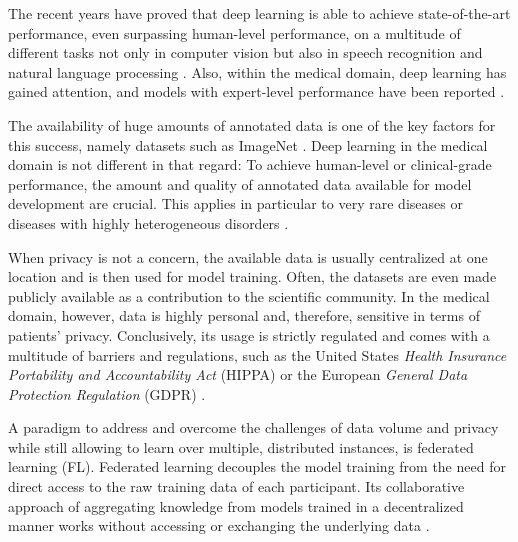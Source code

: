 The recent years have proved that deep learning is able to achieve state-of-the-art performance, even surpassing human-level performance, on a multitude of different tasks not only in computer vision but also in speech recognition and natural language processing \citep{He2015DelvingClassification, Hinton2012DeepGroups, Devlin2019BERT:Understanding}. Also, within the medical domain, deep learning has gained attention, and models with expert-level performance have been reported \citep{Esteva2017Dermatologist-levelNetworks}.

The availability of huge amounts of annotated data is one of the key factors for this success, namely datasets such as ImageNet \citep{Deng2010}. Deep learning in the medical domain is not different in that regard: To achieve human-level or clinical-grade performance, the amount and quality of annotated data available for model development are crucial. This applies in particular to very rare diseases or diseases with highly heterogeneous disorders \citep{Esteva2017Dermatologist-levelNetworks, DeFauw2018ClinicallyDisease, Dluhos2017Multi-centerApproach}.



When privacy is not a concern, the available data is usually centralized at one location and is then used for model training. Often, the datasets are even made publicly available as a contribution to the scientific community. In the medical domain, however, data is highly personal and, therefore, sensitive in terms of patients' privacy. Conclusively, its usage is strictly regulated and comes with a multitude of barriers and regulations, such as the United States \textit{Health Insurance Portability and Accountability Act} (HIPPA) \citep{USDepartmentofHealthandHumanServices2020HealthHIPPA} or the European \textit{General Data Protection Regulation} (GDPR) \citep{EuropeanCommission2018GeneralGDPR} \citep{vanPanhuis2014AHealth}.

A paradigm to address and overcome the challenges of data volume and privacy while still allowing to learn over multiple, distributed instances, is federated learning (FL). Federated learning decouples the model training from the need for direct access to the raw training data of each participant. Its collaborative approach of aggregating knowledge from models trained in a decentralized manner works without accessing or exchanging the underlying data \citep{BrendanMcMahan2017}.

